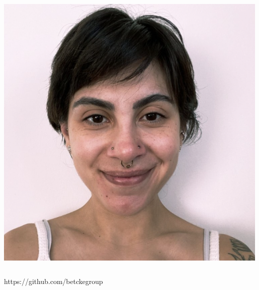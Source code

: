 \begin{frame}
\begin{columns}
\begin{column}{0.5\textwidth}
\begin{center}
\begin{minipage}{0.48\linewidth}
                   \includegraphics[width=\linewidth]{assets/nacha.png}
                   \centering
                \end{minipage}
            \end{center}
        \end{column}
    \end{columns}
    https://github.com/betckegroup
\end{frame}

